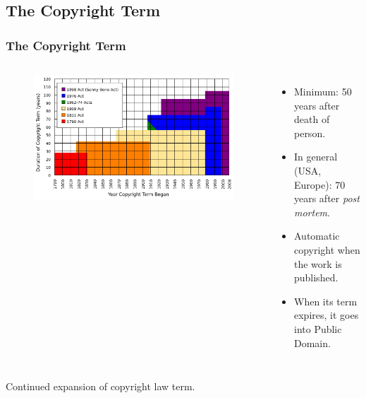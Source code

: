 \documentclass{beamer}
\begin{document}
\subsection{The Copyright Term}
\begin{frame}
\frametitle{The Copyright Term}

\begin{columns}
\column[t]{6cm}

\begin{figure}
\vspace{-0.6cm}
\begin{flushleft}
	\includegraphics[scale=0.18,clip=true]{figs/Copyright_term.png}
\end{flushleft}
\end{figure}

\column[t]{6cm}
\small
\begin{itemize}
\item Minimum: 50 years after death of person. 
\item In general (USA, Europe): 70 years after \textit{post mortem}.
\item Automatic copyright when the work is published.
\item When its term expires, it goes into Public Domain.
\end{itemize}

\end{columns}

\pause
\begin{center}
\alert{Continued expansion of copyright law term.}
\end{center}

\end{frame}
\end{document}
